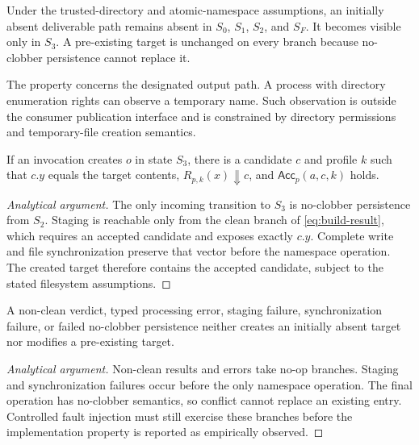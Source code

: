 \begin{property}
\label{prop:no-precommit-visibility}
Under the trusted-directory and atomic-namespace assumptions, an initially
absent deliverable path remains absent in $S_0$, $S_1$, $S_2$, and $S_F$. It
becomes visible only in $S_3$. A pre-existing target is unchanged on every
branch because no-clobber persistence cannot replace it.
\end{property}

The property concerns the designated output path. A process with directory
enumeration rights can observe a temporary name. Such observation is outside
the consumer publication interface and is constrained by directory permissions
and temporary-file creation semantics.

\begin{proposition}
\label{prop:clean-only-filesystem}
If an invocation creates $o$ in state $S_3$, there is a candidate $c$ and
profile $k$ such that $c.y$ equals the target contents,
$R_{p,k}(x)\Downarrow c$, and $\mathsf{Acc}_{p}(a,c,k)$ holds.
\end{proposition}

\begin{proof}[Analytical argument]
The only incoming transition to $S_3$ is no-clobber persistence from $S_2$.
Staging is reachable only from the clean branch of
\cref{eq:build-result}, which requires an accepted candidate and exposes exactly
$c.y$. Complete write and file synchronization preserve that vector before the
namespace operation. The created target therefore contains the accepted
candidate, subject to the stated filesystem assumptions.
\end{proof}

\begin{proposition}
\label{prop:failure-no-target}
A non-clean verdict, typed processing error, staging failure, synchronization
failure, or failed no-clobber persistence neither creates an initially absent
target nor modifies a pre-existing target.
\end{proposition}

\begin{proof}[Analytical argument]
Non-clean results and errors take no-op branches. Staging and synchronization
failures occur before the only namespace operation. The final operation has
no-clobber semantics, so conflict cannot replace an existing entry. Controlled
fault injection must still exercise these branches before the implementation
property is reported as empirically observed.
\end{proof}

